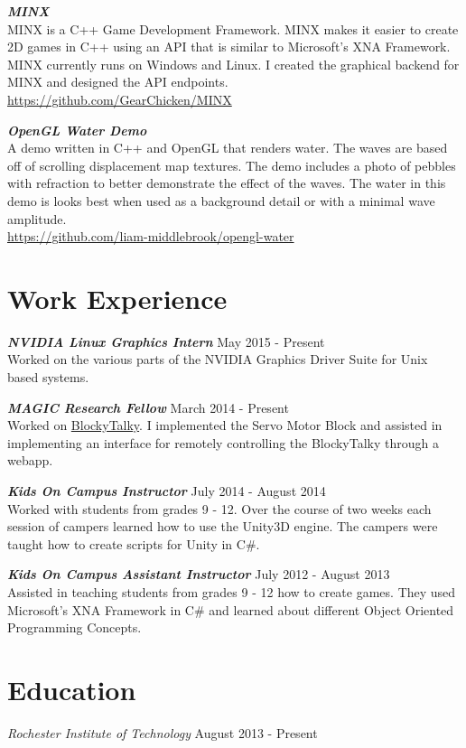 \documentclass[line,margin]{res}
\begin{document}
\begin{resume}
{\textbf{\emph{MINX}}}\\
MINX is a C++ Game Development Framework. MINX makes it easier to create 2D games in C++ using an API
that is similar to Microsoft's XNA Framework. MINX currently runs on Windows and Linux. I created the
graphical backend for MINX and designed the API endpoints.\\
\url{https://github.com/GearChicken/MINX}

{\textbf{\emph{OpenGL Water Demo}}}\\
A demo written in C++ and OpenGL that renders water. The waves are based off of scrolling displacement
map textures. The demo includes a photo of pebbles with refraction to better demonstrate the effect
of the waves. The water in this demo is looks best when used as a background detail or with a minimal
wave amplitude.\\
\url{https://github.com/liam-middlebrook/opengl-water}


\section{Work Experience}

{\textbf{\emph{NVIDIA Linux Graphics Intern}}} \hfill May 2015 - Present\\
Worked on the various parts of the NVIDIA Graphics Driver Suite for Unix based systems.

{\textbf{\emph{MAGIC Research Fellow}}} \hfill March 2014 - Present\\
Worked on \href{https://github.com/liam-middlebrook/blockytalky.git}{BlockyTalky}. I implemented
the Servo Motor Block and assisted in implementing an interface for remotely controlling the
BlockyTalky through a webapp.

{\textbf{\emph{Kids On Campus Instructor}}} \hfill July 2014 - August 2014\\
Worked with students from grades 9 - 12. Over the course of two weeks each session of campers
learned how to use the Unity3D engine. The campers were taught how to create scripts for Unity
in C\#.

{\textbf{\emph{Kids On Campus Assistant Instructor}}} \hfill July 2012 - August 2013\\
Assisted in teaching students from grades 9 - 12 how to create games. They used Microsoft's
XNA Framework in C\# and learned about different Object Oriented Programming Concepts.


\section{Education}
{\sl Rochester Institute of Technology} \hfill August 2013 - Present


\end{resume}
\end{document}

